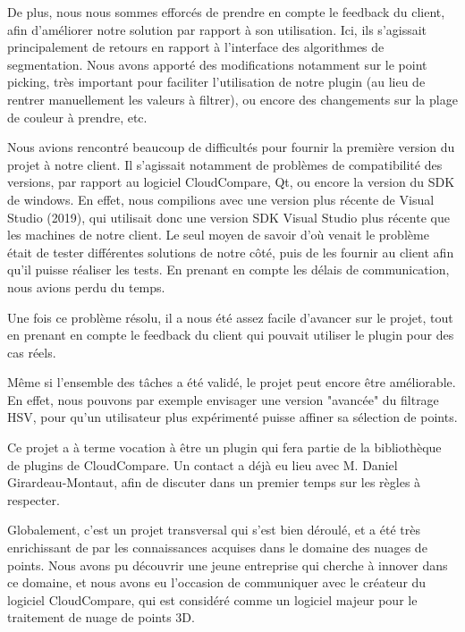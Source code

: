 \documentclass[12pt,titlepage,french]{article}
\begin{document}
De plus, nous nous sommes efforcés de prendre en compte le feedback du client, afin d'améliorer notre solution par rapport à son utilisation. Ici, ils s'agissait principalement de retours en rapport à l'interface des algorithmes de segmentation. Nous avons apporté des modifications notamment sur le point picking, très important pour faciliter l'utilisation de notre plugin (au lieu de rentrer manuellement les valeurs à filtrer), ou encore des changements sur la plage de couleur à prendre, etc. \newline

Nous avions rencontré beaucoup de difficultés pour fournir la première version du projet à notre client. Il s'agissait notamment de problèmes de compatibilité des versions, par rapport au logiciel CloudCompare, Qt, ou encore la version du SDK de windows. En effet, nous compilions avec une version plus récente de Visual Studio (2019), qui utilisait donc une version SDK Visual Studio plus récente que les machines de notre client. Le seul moyen de savoir d'où venait le problème était de tester différentes solutions de notre côté, puis de les fournir au client afin qu'il puisse réaliser les tests. En prenant en compte les délais de communication, nous avions perdu du temps. \newline

Une fois ce problème résolu, il a nous été assez facile d'avancer sur le projet, tout en prenant en compte le feedback du client qui pouvait utiliser le plugin pour des cas réels. \newline

Même si l'ensemble des tâches a été validé, le projet peut encore être améliorable. En effet, nous pouvons par exemple envisager une version "avancée" du filtrage HSV, pour qu'un utilisateur plus expérimenté puisse affiner sa sélection de points. \newline

Ce projet a à terme vocation à être un plugin qui fera partie de la bibliothèque de plugins de CloudCompare. Un contact a déjà eu lieu avec M. Daniel Girardeau-Montaut, afin de discuter dans un premier temps sur les règles à respecter. \newline

Globalement, c'est un projet transversal qui s'est bien déroulé, et a été très enrichissant de par les connaissances acquises dans le domaine des nuages de points. Nous avons pu découvrir une jeune entreprise qui cherche à innover dans ce domaine, et nous avons eu l'occasion de communiquer avec le créateur du logiciel CloudCompare, qui est considéré comme un logiciel majeur pour le traitement de nuage de points 3D.
\end{document}
